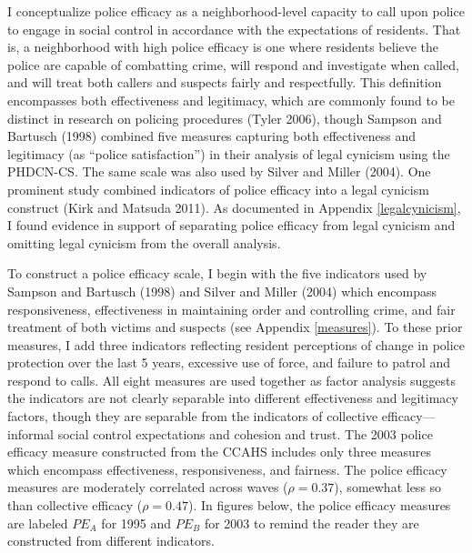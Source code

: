\documentclass [11pt, proquest] {uwthesis}[2015/03/03]
\begin{document}
I conceptualize police efficacy as a neighborhood-level capacity to call upon police to engage in social control in accordance with the expectations of residents. That is, a neighborhood with high police efficacy is one where residents believe the police are capable of combatting crime, will respond and investigate when called, and will treat both callers and suspects fairly and respectfully. This definition encompasses both effectiveness and legitimacy, which are commonly found to be distinct in research on policing procedures (Tyler 2006), though Sampson and Bartusch (1998) combined five measures capturing both effectiveness and legitimacy (as ``police satisfaction'') in their analysis of legal cynicism using the PHDCN-CS. The same scale was also used by Silver and Miller (2004). One prominent study combined indicators of police efficacy into a legal cynicism construct (Kirk and Matsuda 2011). As documented in Appendix \ref{legalcynicism}, I found evidence in support of separating police efficacy from legal cynicism and omitting legal cynicism from the overall analysis.

To construct a police efficacy scale, I begin with the five indicators used by Sampson and Bartusch (1998) and Silver and Miller (2004) which encompass responsiveness, effectiveness in maintaining order and controlling crime, and fair treatment of both victims and suspects (see Appendix \ref{measures}). To these prior measures, I add three indicators reflecting resident perceptions of change in police protection over the last 5 years, excessive use of force, and failure to patrol and respond to calls. All eight measures are used together as factor analysis suggests the indicators are not clearly separable into different effectiveness and legitimacy factors, though they are separable from the indicators of collective efficacy---informal social control expectations and cohesion and trust. The 2003 police efficacy measure constructed from the CCAHS includes only three measures which encompass effectiveness, responsiveness, and fairness. The police efficacy measures are moderately correlated across waves (\(\rho = 0.37\)), somewhat less so than collective efficacy (\(\rho = 0.47\)). In figures below, the police efficacy measures are labeled \(PE_{A}\) for 1995 and \(PE_{B}\) for 2003 to remind the reader they are constructed from different indicators.
\end{document}
